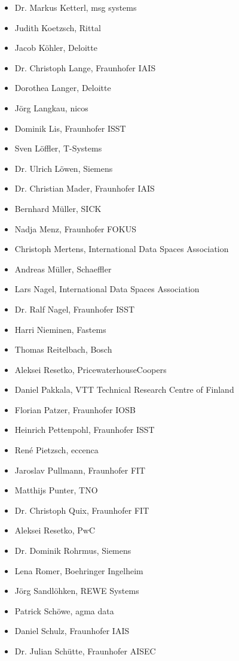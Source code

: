 \begin{multicols}{2}
\begin{itemize}
	\item 	Dr. Markus Ketterl, msg systems
	\item 	Judith Koetzsch, Rittal
	\item 	Jacob Köhler, Deloitte
	\item 	Dr. Christoph Lange, Fraunhofer IAIS
	\item 	Dorothea Langer, Deloitte
	\item 	Jörg Langkau, nicos
	\item 	Dominik Lis, Fraunhofer ISST
	\item 	Sven Löffler, T-Systems
	\item 	Dr. Ulrich Löwen, Siemens
	\item 	Dr. Christian Mader, Fraunhofer IAIS
	\item 	Bernhard Müller, SICK
	\item 	Nadja Menz, Fraunhofer FOKUS
	\item 	Christoph Mertens, International Data Spaces Association
	\item 	Andreas Müller, Schaeffler
	\item 	Lars Nagel, International Data Spaces Association
	\item 	Dr. Ralf Nagel, Fraunhofer ISST
	\item 	Harri Nieminen, Fastems
	\item 	Thomas Reitelbach, Bosch
	\item 	Aleksei Resetko, PricewaterhouseCoopers
	\item 	Daniel Pakkala, VTT Technical Research Centre of Finland
	\item 	Florian Patzer, Fraunhofer IOSB
	\item 	Heinrich Pettenpohl, Fraunhofer ISST
	\item 	René Pietzsch, eccenca
	\item 	Jaroslav Pullmann, Fraunhofer FIT
	\item 	Matthijs Punter, TNO
	\item 	Dr. Christoph Quix, Fraunhofer FIT
	\item 	Aleksei Resetko, PwC
	\item 	Dr. Dominik Rohrmus, Siemens
	\item 	Lena Romer, Boehringer Ingelheim
	\item 	Jörg Sandlöhken, REWE Systems
	\item 	Patrick Schöwe, agma data
	\item 	Daniel Schulz, Fraunhofer IAIS
	\item 	Dr. Julian Schütte, Fraunhofer AISEC

\end{itemize}
\end{multicols}
